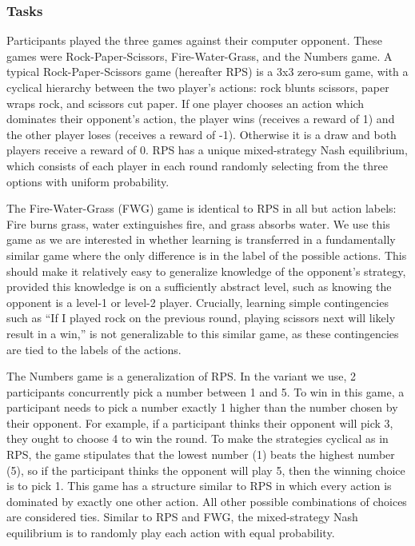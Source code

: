 \documentclass[smallextended]{svjour3}       %
\begin{document}
\hypertarget{tasks}{%
\subsubsection{Tasks}\label{tasks}}

Participants played the three games against their computer opponent.
These games were Rock-Paper-Scissors, Fire-Water-Grass, and the Numbers
game. A typical Rock-Paper-Scissors game (hereafter RPS) is a 3x3
zero-sum game, with a cyclical hierarchy between the two player's
actions: rock blunts scissors, paper wraps rock, and scissors cut paper.
If one player chooses an action which dominates their opponent's action,
the player wins (receives a reward of 1) and the other player loses
(receives a reward of -1). Otherwise it is a draw and both players
receive a reward of 0. RPS has a unique mixed-strategy Nash equilibrium,
which consists of each player in each round randomly selecting from the
three options with uniform probability.

The Fire-Water-Grass (FWG) game is identical to RPS in all but action
labels: Fire burns grass, water extinguishes fire, and grass absorbs
water. We use this game as we are interested in whether learning is
transferred in a fundamentally similar game where the only difference is
in the label of the possible actions. This should make it relatively
easy to generalize knowledge of the opponent's strategy, provided this
knowledge is on a sufficiently abstract level, such as knowing the
opponent is a level-1 or level-2 player. Crucially, learning simple
contingencies such as ``If I played rock on the previous round, playing
scissors next will likely result in a win,'' is not generalizable to
this similar game, as these contingencies are tied to the labels of the
actions.

The Numbers game is a generalization of RPS. In the variant we use, 2
participants concurrently pick a number between 1 and 5. To win in this
game, a participant needs to pick a number exactly 1 higher than the
number chosen by their opponent. For example, if a participant thinks
their opponent will pick 3, they ought to choose 4 to win the round. To
make the strategies cyclical as in RPS, the game stipulates that the
lowest number (1) beats the highest number (5), so if the participant
thinks the opponent will play 5, then the winning choice is to pick 1.
This game has a structure similar to RPS in which every action is
dominated by exactly one other action. All other possible combinations
of choices are considered ties. Similar to RPS and FWG, the
mixed-strategy Nash equilibrium is to randomly play each action with
equal probability.
\end{document}
